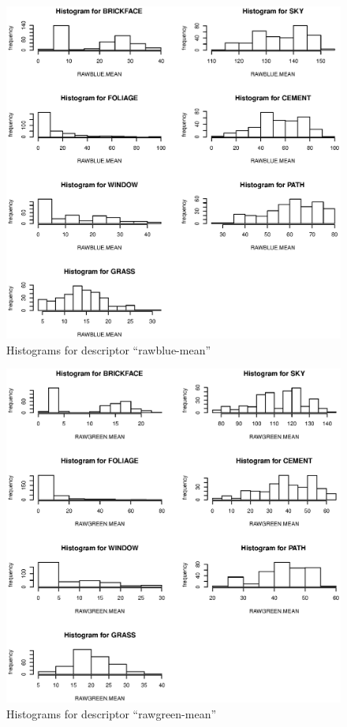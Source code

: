 \documentclass{article}
\begin{document}
\begin{figure}[htp]
\centering
\includegraphics[width=12cm]{a12.eps}
\caption{Histograms for descriptor ``rawblue-mean''}
\end{figure}

\begin{figure}[htp]
\centering
\includegraphics[width=12cm]{a13.eps}
\caption{Histograms for descriptor ``rawgreen-mean''}
\end{figure}
\end{document}
